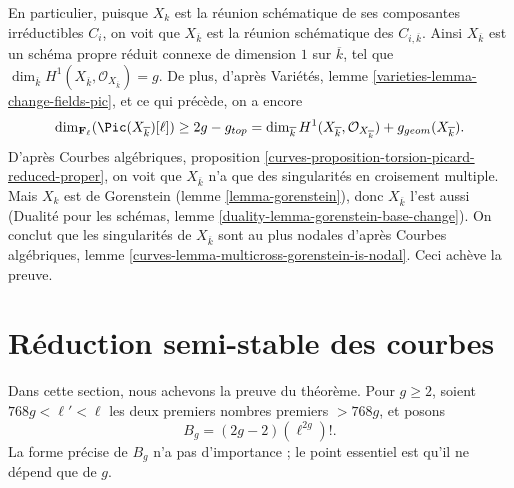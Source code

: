 \medskip\noindent
En particulier, puisque $X_k$ est la réunion schématique de ses composantes
irréductibles $C_i$, on voit que $X_{\overline{k}}$ est la réunion
schématique des $C_{i,\overline{k}}$. Ainsi $X_{\overline{k}}$ est un
schéma propre réduit connexe de dimension $1$ sur $\overline{k}$, tel que
$\dim_{\overline{k}}H^1(X_{\overline{k}},
\mathcal{O}_{X_{\overline{k}}})=g$. De plus, d'après Variétés, lemme
\ref{varieties-lemma-change-fields-pic}, et ce qui précède, on a encore
$$
\dim_{\mathbf{F}_\ell}(\Pic(X_{\overline{k}})[\ell])
\geq 2g - g_{top} =
\dim_{\overline{k}} H^1(X_{\overline{k}}, \mathcal{O}_{X_{\overline{k}}})
+ g_{geom}(X_{\overline{k}}).
$$
D'après Courbes algébriques, proposition
\ref{curves-proposition-torsion-picard-reduced-proper}, on voit que
$X_{\overline{k}}$ n'a que des singularités en croisement multiple.
Mais $X_k$ est de Gorenstein (lemme \ref{lemma-gorenstein}), donc
$X_{\overline{k}}$ l'est aussi (Dualité pour les schémas, lemme
\ref{duality-lemma-gorenstein-base-change}). On conclut que les singularités
de $X_{\overline{k}}$ sont au plus nodales d'après Courbes algébriques,
lemme \ref{curves-lemma-multicross-gorenstein-is-nodal}. Ceci achève la
preuve.









\section{Réduction semi-stable des courbes}
\label{section-semistable-reduction-theorem}

\noindent
Dans cette section, nous achevons la preuve du théorème. Pour $g\geq2$,
soient $768g<\ell'<\ell$ les deux premiers nombres premiers $>768g$, et
posons
\begin{equation}
\label{equation-bound}
B_g = (2g - 2)(\ell^{2g})!.
\end{equation}
La forme précise de $B_g$ n'a pas d'importance ; le point essentiel est
qu'il ne dépend que de $g$.

